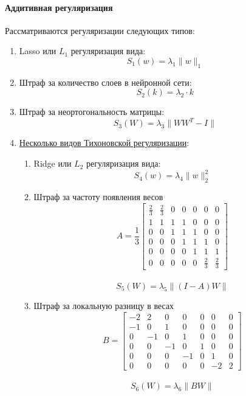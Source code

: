\documentclass[12pt, twoside]{article}
\begin{document}
\paragraph{Аддитивная регуляризация}
Рассматриваются регуляризации следующих типов:
\begin{enumerate}[label*=\arabic*.]
    \item
    Lasso или $L_1$ регуляризация вида:
    \[S_1(w) = \lambda_1\|w\|_1\]
    \item
    Штраф за количество слоев в нейронной сети:
    \[S_2(k) = \lambda_2 \cdot k\]
    \item
    Штраф за неортогональность матрицы:
    \[S_3(W) = \lambda_3\|WW^T - I\|\]
    \item 
     \href{https://towardsdatascience.com/tikhonov-regularization-an-example-other-than-l2-8922ba51253d}{Несколько видов Тихоновской регуляризации}:
    \begin{enumerate}[label*=\arabic*.]
        \item
        Ridge или $L_2$ регуляризация вида:
        \[S_4(w) = \lambda_4\|w\|_2^2\]
        \item
        Штраф за частоту появления весов
        \[
        A = \frac{1}{3} \begin{bmatrix}
            \frac{2}{3}& \frac{2}{3} & 0 & 0 &0 &0& 0\\
            1 & 1 & 1 & 1& 0 & 0 & 0 \\
            0& 0& 1 & 1& 1 & 0 & 0 \\
            0& 0& 0 & 1& 1 & 1 & 0 \\
            0& 0& 0 & 0& 1 & 1 & 1\\
            0& 0& 0 & 0 & 0& \frac{2}{3}& \frac{2}{3}
        \end{bmatrix}
        \]
        \\
        
        \[S_5(W) = \lambda_5 \|(I -A)W\|\]
        \item 
        Штраф за локальную разницу в весах
        \[
        B = \begin{bmatrix}
            -2& 2 & 0 & 0 & 0 &0 &0\\
            -1 & 0 & 1 & 0& 0 & 0 & 0 \\
            0& -1& 0 & 1& 0 & 0 & 0 \\
            0& 0& -1 & 0& 1 & 0 & 0 \\
            0& 0& 0 & -1& 0 & 1 & 0\\
            0& 0& 0 & 0 & 0& -2& 2
        \end{bmatrix}
        \]
        \\
        \[S_6(W) = \lambda_6 \|BW\|\]
    \end{enumerate}
\end{enumerate}
\end{document}
